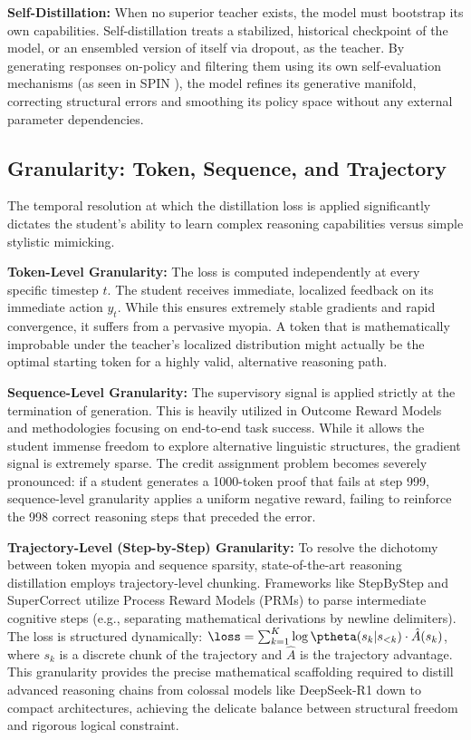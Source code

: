 \textbf{Self-Distillation:} When no superior teacher exists, the model must bootstrap its own capabilities. Self-distillation treats a stabilized, historical checkpoint of the model, or an ensembled version of itself via dropout, as the teacher. By generating responses on-policy and filtering them using its own self-evaluation mechanisms (as seen in SPIN \citep{2401.01335}), the model refines its generative manifold, correcting structural errors and smoothing its policy space without any external parameter dependencies.

\subsection{Granularity: Token, Sequence, and Trajectory}
\label{subsec:tax_granularity}

The temporal resolution at which the distillation loss is applied significantly dictates the student's ability to learn complex reasoning capabilities versus simple stylistic mimicking.

\textbf{Token-Level Granularity:} The loss is computed independently at every specific timestep $t$. The student receives immediate, localized feedback on its immediate action $y_t$. While this ensures extremely stable gradients and rapid convergence, it suffers from a pervasive myopia. A token that is mathematically improbable under the teacher's localized distribution might actually be the optimal starting token for a highly valid, alternative reasoning path.

\textbf{Sequence-Level Granularity:} The supervisory signal is applied strictly at the termination of generation. This is heavily utilized in Outcome Reward Models and methodologies focusing on end-to-end task success. While it allows the student immense freedom to explore alternative linguistic structures, the gradient signal is extremely sparse. The credit assignment problem becomes severely pronounced: if a student generates a 1000-token proof that fails at step 999, sequence-level granularity applies a uniform negative reward, failing to reinforce the 998 correct reasoning steps that preceded the error.

\textbf{Trajectory-Level (Step-by-Step) Granularity:} To resolve the dichotomy between token myopia and sequence sparsity, state-of-the-art reasoning distillation employs trajectory-level chunking. Frameworks like StepByStep \citep{2305.02301} and SuperCorrect \citep{2410.09008} utilize Process Reward Models (PRMs) \citep{2305.20050} to parse intermediate cognitive steps (e.g., separating mathematical derivations by newline delimiters). The loss is structured dynamically: $\loss = \sum_{k=1}^K \log \ptheta(s_k | s_{<k}) \cdot \hat{A}(s_k)$, where $s_k$ is a discrete chunk of the trajectory and $\hat{A}$ is the trajectory advantage. This granularity provides the precise mathematical scaffolding required to distill advanced reasoning chains from colossal models like DeepSeek-R1 down to compact architectures, achieving the delicate balance between structural freedom and rigorous logical constraint.
